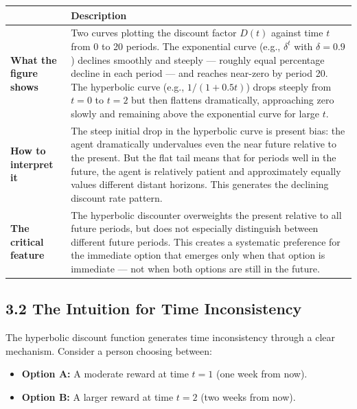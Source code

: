 \documentclass[12pt, letterpaper]{article}
\begin{document}
\begin{table}[H]
\centering
\small

\begin{tabularx}{\linewidth}{lX}
\toprule
 & Description \\
\midrule

\textbf{What the figure shows} 
& Two curves plotting the discount factor $D(t)$ against time $t$ from 0 to 20 periods. The exponential curve (e.g., $\delta^t$ with $\delta = 0.9$) declines smoothly and steeply --- roughly equal percentage decline in each period --- and reaches near-zero by period 20. The hyperbolic curve (e.g., $1/(1+0.5t)$) drops steeply from $t=0$ to $t=2$ but then flattens dramatically, approaching zero slowly and remaining above the exponential curve for large $t$. \\

\textbf{How to interpret it} 
& The steep initial drop in the hyperbolic curve is present bias: the agent dramatically undervalues even the near future relative to the present. But the flat tail means that for periods well in the future, the agent is relatively patient and approximately equally values different distant horizons. This generates the declining discount rate pattern. \\

\textbf{The critical feature} 
& The hyperbolic discounter overweights the present relative to all future periods, but does not especially distinguish between different future periods. This creates a systematic preference for the immediate option that emerges only when that option is immediate --- not when both options are still in the future. \\

\bottomrule
\end{tabularx}

\end{table}


\subsection{3.2 The Intuition for Time Inconsistency}


The hyperbolic discount function generates time inconsistency through a clear mechanism. Consider a person choosing between:
\begin{itemize}
\item \textbf{Option A:} A moderate reward at time $t=1$ (one week from now).
\item \textbf{Option B:} A larger reward at time $t=2$ (two weeks from now).
\end{itemize}
\end{document}
